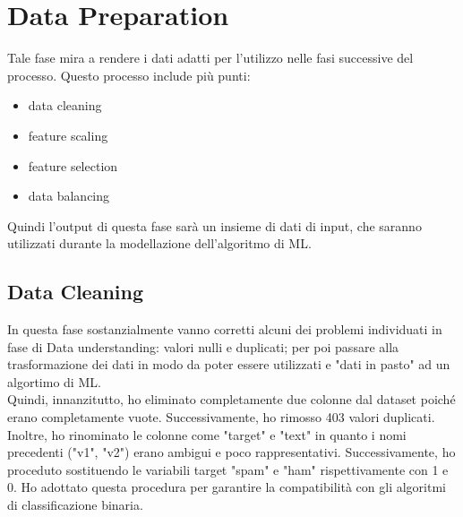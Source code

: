 \documentclass[]{article}
\begin{document}
    \section{Data Preparation}
        Tale fase mira a rendere i dati adatti per l'utilizzo nelle fasi successive del processo. Questo processo include più punti:
        \begin{itemize}
            \item data cleaning
            \item feature scaling
            \item feature selection
            \item data balancing
        \end{itemize}
         Quindi l'output di questa fase sarà un insieme di dati di input, che saranno utilizzati durante la modellazione dell'algoritmo di ML.
    \subsection{Data Cleaning}
        In questa fase sostanzialmente vanno corretti alcuni dei problemi individuati in fase di Data understanding: valori nulli e duplicati; per poi passare alla trasformazione dei dati in modo da poter essere utilizzati e "dati in pasto" ad un algortimo di ML.\\
        Quindi, innanzitutto, ho eliminato completamente due colonne dal dataset poiché erano completamente vuote. Successivamente, ho rimosso 403 valori duplicati. Inoltre, ho rinominato le colonne come "target" e "text" in quanto i nomi precedenti ("v1", "v2") erano ambigui e poco rappresentativi. Successivamente, ho proceduto sostituendo le variabili target "spam" e "ham" rispettivamente con 1 e 0. Ho adottato questa procedura per garantire la compatibilità con gli algoritmi di classificazione binaria.
\end{document}
